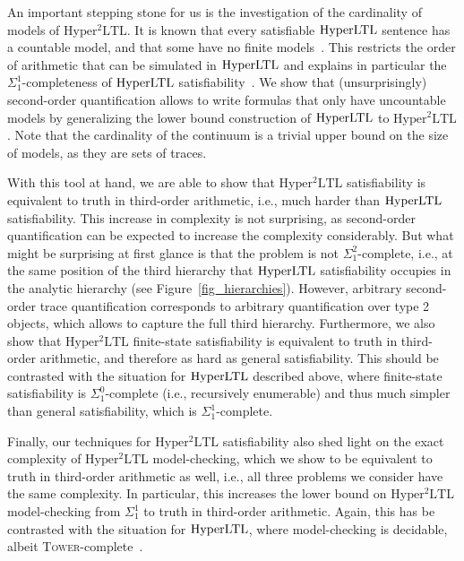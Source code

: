 \documentclass[dvipsnames,10pt,a4paper]{amsart}
\theoremstyle{definition}
\theoremstyle{remark}
\newcommand{\hyltl}{\mathrm{Hyper\-LTL}\xspace}
\newcommand{\sohyltl}{\mathrm{Hyper^2LTL}\xspace}
\newcommand{\tower}{\textsc{Tower}\xspace}
\begin{document}
An important stepping stone for us is the investigation of the cardinality of models of $\sohyltl$. 
It is known that every satisfiable $\hyltl$ sentence has a countable model, and that some have no finite models~\cite{FZ17}.
This restricts the order of arithmetic that can be simulated in $\hyltl$ and explains in particular the $\Sigma_1^1$-completeness of $\hyltl$ satisfiability~\cite{hyperltlsatconf}.
We show that (unsurprisingly) second-order quantification allows to write formulas that only have uncountable models by generalizing the lower bound construction of $\hyltl$ to $\sohyltl$. 
Note that the cardinality of the continuum is a trivial upper bound on the size of models, as they are sets of traces. 

With this tool at hand, we are able to show that $\sohyltl$ satisfiability is equivalent to truth in third-order arithmetic, i.e., much harder than $\hyltl$ satisfiability.
This increase in complexity is not surprising, as second-order quantification can be expected to increase the complexity considerably.
But what might be surprising at first glance is that the problem is not $\Sigma_1^2$-complete, i.e., at the same position of the third hierarchy that $\hyltl$ satisfiability occupies in the analytic hierarchy (see Figure~\ref{fig_hierarchies}). However, arbitrary second-order trace quantification corresponds to arbitrary quantification over type 2 objects, which allows to capture the full third hierarchy.
Furthermore, we also show that $\sohyltl$ finite-state satisfiability is equivalent to truth in third-order arithmetic, and therefore as hard as general satisfiability.
This should be contrasted with the situation for $\hyltl$ described above, where finite-state satisfiability is $\Sigma_1^0$-complete (i.e., recursively enumerable) and thus much simpler than general satisfiability, which is $\Sigma_1^1$-complete.


Finally, our techniques for $\sohyltl$ satisfiability also shed light on the exact complexity of $\sohyltl$ model-checking, which we show to be equivalent to  truth in third-order arithmetic as well, i.e., all three problems we consider have the same complexity. In particular, this increases the lower bound on $\sohyltl$ model-checking from $\Sigma_1^1$ to truth in third-order arithmetic.
Again, this has be contrasted with the situation for $\hyltl$, where model-checking is decidable, albeit \tower-complete~\cite{Rabe16diss,MZ20}.
\end{document}

